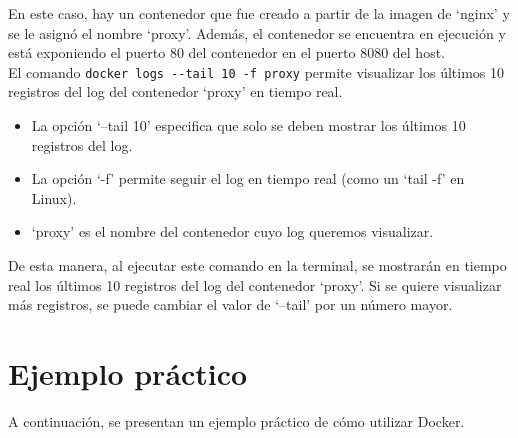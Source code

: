 \documentclass{article}
\begin{document}
En este caso, hay un contenedor que fue creado a partir de la imagen de \enquote*{nginx} y se le asignó el nombre \enquote*{proxy}. Además, el contenedor se encuentra en ejecución y está exponiendo el puerto 80 del contenedor en el puerto 8080 del host.\\
El comando \lstinline{docker logs --tail 10 -f proxy} permite visualizar los últimos 10 registros del log del contenedor \enquote*{proxy} en tiempo real.
\begin{itemize}
\item La opción \enquote*{--tail 10} especifica que solo se deben mostrar los últimos 10 registros del log.
\item La opción \enquote*{-f} permite seguir el log en tiempo real (como un \enquote*{tail -f} en Linux).
\item \enquote*{proxy} es el nombre del contenedor cuyo log queremos visualizar.
\end{itemize}
De esta manera, al ejecutar este comando en la terminal, se mostrarán en tiempo real los últimos 10 registros del log del contenedor \enquote*{proxy}. Si se quiere visualizar más registros, se puede cambiar el valor de \enquote*{--tail} por un número mayor.

\newpage
\section{Ejemplo práctico}
A continuación, se presentan un ejemplo práctico de cómo utilizar Docker.
\end{document}
